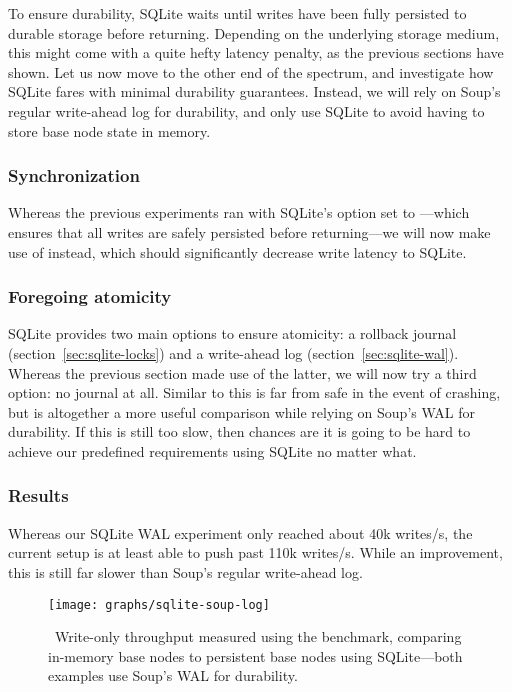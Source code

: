 To ensure durability, SQLite waits until writes have been fully persisted to
durable storage before returning. Depending on the underlying storage medium,
this might come with a quite hefty latency penalty, as the previous sections
have shown. Let us now move to the other end of the spectrum, and investigate
how SQLite fares with minimal durability guarantees. Instead, we will rely on
Soup's regular write-ahead log for durability, and only use SQLite to avoid
having to store base node state in memory.

\subsubsection{Synchronization}

Whereas the previous experiments ran with SQLite's  option set
to ---which ensures that all writes are safely persisted before
returning---we will now make use of  instead, which
should significantly decrease write latency to SQLite.

\subsubsection{Foregoing atomicity}

SQLite provides two main options to ensure atomicity: a rollback journal
(section~\ref{sec:sqlite-locks}) and a write-ahead log
(section~\ref{sec:sqlite-wal}). Whereas the previous section made use of the
latter, we will now try a third option: no journal at all. Similar to
 this is far from safe in the event of crashing, but
is altogether a more useful comparison while relying on Soup's WAL for
durability. If this is still too slow, then chances are it is going to be hard
to achieve our predefined requirements using SQLite no matter what.

\subsubsection{Results}

Whereas our SQLite WAL experiment only reached about 40k writes/s, the current
setup is at least able to push past 110k writes/s. While an improvement, this
is still far slower than Soup's regular write-ahead log.

\begin{figure}[H]
  \centering
  \texttt{[image: graphs/sqlite-soup-log]}
  \caption{\
    Write-only throughput measured using the  benchmark, comparing
    in-memory base nodes to persistent base nodes using SQLite---both examples
    use Soup's WAL for durability.
  }\label{graph:sqlite-soup-log}
\end{figure}

